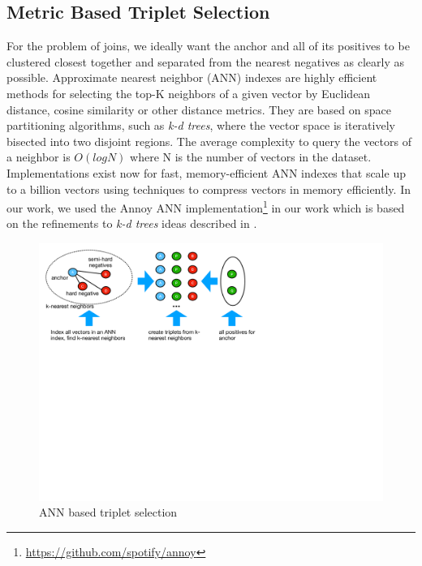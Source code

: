 
\subsection{Metric Based Triplet Selection}
For the problem of joins, we ideally want the anchor and all of its positives to be clustered closest together and separated from the nearest negatives as clearly as possible.  Approximate nearest neighbor (ANN) indexes are highly efficient methods for selecting the top-K neighbors of a given vector by Euclidean distance, cosine similarity or other distance metrics.  They are based on space partitioning algorithms, such as \textit{k-d trees}, where the vector space is iteratively bisected into two disjoint regions.  The average complexity to query the vectors of a neighbor is $O(log N)$ where N is the number of vectors in the dataset.  Implementations exist now for fast, memory-efficient ANN indexes that scale up to a billion vectors \cite{JDH17} using techniques to compress vectors in memory efficiently.  In our work, we used the Annoy ANN implementation\footnote{\url{https://github.com/spotify/annoy}} in our work which is based on the refinements to \textit{k-d trees} ideas described in \cite{ann_paper}.

\begin{figure}
\includegraphics[width=0.8\linewidth]{ANN_selection}
\caption{ANN based triplet selection}
\label{ANN_selection}
\end{figure}

